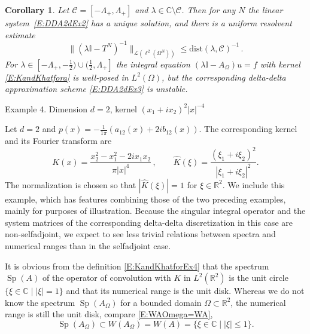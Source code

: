 \documentclass[12pt]{amsart}
\makeatletter
\def\subsection{\@startsection{section}{1}%
  \z@{1.2\linespacing\@plus\linespacing}{.5\linespacing}%
  {\normalfont\scshape\centering}}
\def\subsection{\@startsection{subsection}{2}%
  \z@{0.9\linespacing\@plus.7\linespacing}{-.5em}%
  {\normalfont\bfseries}}
\newtheorem{corollary}[theorem]{Corollary}
\theoremstyle{definition}
\theoremstyle{remark}
\numberwithin{equation}{section}
\newcommand\C{{\mathbb C}}
\newcommand\R{{\mathbb R}}
\newcommand\cC{{\mathcal{C}}}
\newcommand\cL{{\mathcal{L}}}
\newcommand {\Id}{\mathbb I}
\newcommand{\dist}{\mathrm{dist}}
\newcommand{\Sp}{\mathop{\mathrm{Sp}}\nolimits}
\let\hat=\widehat
\makeatother
\begin{document}
\begin{corollary}
 \label{C:stabEX3}
 Let $\cC=[-\Lambda_{+},\Lambda_{+}]$ and $\lambda\in\C\setminus\cC$. Then for any $N$ the linear system~\eqref{E:DDA2dEx2} has a unique solution, and there is a uniform resolvent estimate 
\begin{equation}
\label{E:ResTNex3}
 \|(\lambda\Id-T^{N})^{-1}\|_{\cL(\ell^{2}(\Omega^{N}))} \le \dist(\lambda,\cC)^{-1}\,.
\end{equation}
For $\lambda\in[-\Lambda_{+},-\frac12)\cup(\frac12,\Lambda_{+}]$ the integral equation 
$(\lambda \Id -A_{\Omega})u=f$ with kernel \eqref{E:KandKhatfora} is well-posed in $L^{2}(\Omega)$, but the corresponding delta-delta approximation scheme \eqref{E:DDA2dEx3} is unstable.
\end{corollary}

\label{Ex:4}
\subsection{Example 4. Dimension $d=2$, kernel $(x_{1}+ix_{2})^{2}|x|^{-4}$}\label{SS:2da+ib}\ %

Let $d=2$ and $p(x)=-\frac1{1\pi} (a_{12}(x)+2ib_{12}(x))$. The corresponding kernel and its Fourier transform are
\begin{equation}
\label{E:KandKhatforEx4}
 K(x) = \frac{x_{2}^{2}-x_{1}^{2}-2ix_{1}x_{2}}{\pi|x|^{4}}\,,\qquad
 \hat K(\xi) = \frac{(\xi_{1}+i\xi_{2})^{2}}{|\xi_{1}+i\xi_{2}|^{2}}.
\end{equation}
The normalization is chosen so that $|\hat K(\xi)|=1$ for $\xi\in\R^{2}$.
We include this example, which has features combining those of the two preceding examples, mainly for purposes of illustration. Because the singular integral operator and the system matrices of the corresponding delta-delta discretization in this case are non-selfadjoint, we expect to see less trivial relations between spectra and numerical ranges than in the selfadjoint case.

It is obvious from the definition \eqref{E:KandKhatforEx4} that the spectrum $\Sp(A)$ of the operator of convolution with $K$ in $L^{2}(\R^{2})$ is the unit circle 
$\{\xi\in\C\mid |\xi|=1\}$ and that its numerical range is the unit disk. Whereas we do not know the spectrum $\Sp(A_{\Omega})$ for a bounded domain $\Omega\subset\R^{2}$, the numerical range is still the unit disk, compare \eqref{E:WAOmega=WA}, 
\begin{equation}
\label{E:SpW(AOmega)Ex4}
 \Sp(A_{\Omega})\subset W(A_{\Omega}) = W(A) = \{\xi\in\C\mid |\xi|\le1\}.
\end{equation}
\end{document}

